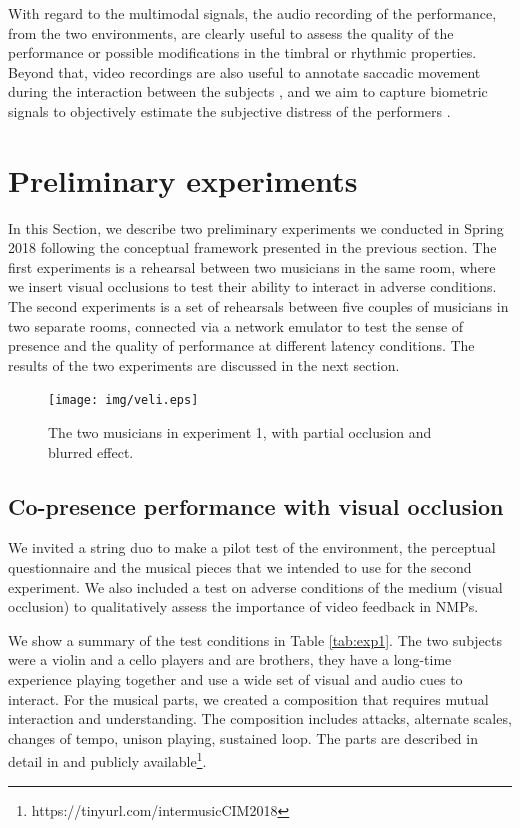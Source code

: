 \documentclass[conference]{IEEEtran}
\begin{document}
With regard to the multimodal signals, the audio recording of the performance, from the two environments, are clearly useful to assess the quality of the performance or possible modifications in the timbral or rhythmic properties. Beyond that, video recordings are also useful to annotate saccadic movement during the interaction between the subjects \cite{vandemoortele2018gazing}, and we aim to capture biometric signals to objectively estimate the subjective distress of the performers \cite{Yoshie2009}. 



\section{Preliminary experiments}\label{sec:setup}
In this Section, we describe two preliminary experiments we conducted in Spring 2018 following the conceptual framework presented in the previous section. The first experiments is a rehearsal between two musicians in the same room, where we insert visual occlusions to test their ability to interact in adverse conditions. The second experiments is a set of rehearsals between five couples of musicians in two separate rooms, connected via a network emulator to test the sense of presence and the quality of performance at different latency conditions. The results of the two experiments are discussed in the next section.


\begin{figure}[t]
	\centering
	\texttt{[image: img/veli.eps]}
	\caption{The two musicians in experiment 1, with partial occlusion and blurred effect.}
	\label{fig:veli}
\end{figure}

\subsection{Co-presence performance with visual occlusion}
We invited a string duo to make a pilot test of the environment, the perceptual questionnaire and the musical pieces that we intended to use for the second experiment. We also included a test on adverse conditions of the medium (visual occlusion) to qualitatively assess the importance of video feedback in NMPs.

We show a summary of the test conditions in Table \ref{tab:exp1}. The two subjects were a violin and a cello players and are brothers, they have a long-time experience playing together and use a wide set of visual and audio cues to interact. For the musical parts, we created a composition that requires mutual interaction and understanding. The composition includes attacks, alternate scales, changes of tempo, unison playing, sustained loop. The parts are described in detail in \cite{CIM2018} and publicly available\footnote{https://tinyurl.com/intermusicCIM2018}.
\end{document}

